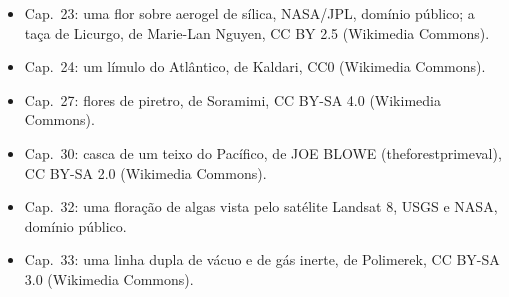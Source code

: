 \begin{itemize}
        público (Wikimedia Commons).
  \item Cap.~23: uma flor sobre aerogel de sílica, NASA/JPL, domínio público; a
        taça de Licurgo, de Marie-Lan Nguyen, CC BY 2.5 (Wikimedia Commons).
  \item Cap.~24: um límulo do Atlântico, de Kaldari, CC0 (Wikimedia
        Commons).
  \item Cap.~27: flores de piretro, de Soramimi, CC BY-SA 4.0 (Wikimedia
        Commons).
  \item Cap.~30: casca de um teixo do Pacífico, de JOE BLOWE (theforestprimeval),
        CC BY-SA 2.0 (Wikimedia Commons).
  \item Cap.~32: uma floração de algas vista pelo satélite Landsat 8, USGS e NASA,
        domínio público.
  \item Cap.~33: uma linha dupla de vácuo e de gás inerte, de Polimerek, CC BY-SA
        3.0 (Wikimedia Commons).
\end{itemize}
\clearpage
